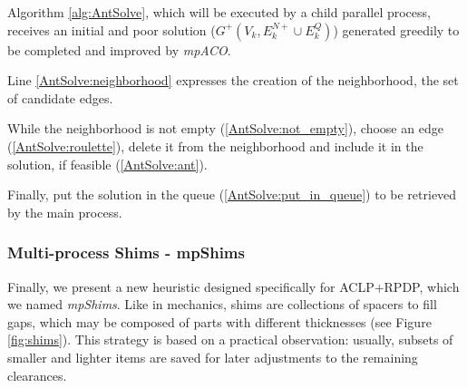 \documentclass[preprint,authoryear]{elsarticle}
\begin{document}
Algorithm \ref{alg:AntSolve}, which will be executed by a child parallel process, receives an initial and poor solution ($G^+(V_k, E^{N+}_k \cup E^Q_k)$) generated greedily to be completed and improved by {\it mpACO}.

Line \ref{AntSolve:neighborhood} expresses the creation of the neighborhood, the set of candidate edges.

While the neighborhood is not empty (\ref{AntSolve:not_empty}), choose an edge (\ref{AntSolve:roulette}), delete it from the neighborhood and include it in the solution, if feasible (\ref{AntSolve:ant}).

Finally, put the solution in the queue (\ref{AntSolve:put_in_queue}) to be retrieved by the main process.


\subsubsection{Multi-process Shims - mpShims}


Finally, we present a new heuristic designed specifically for ACLP+RPDP, which we named \emph{mpShims}. Like in mechanics, shims are collections of spacers to fill gaps, which may be composed of parts with different thicknesses (see Figure \ref{fig:shims}). This strategy is based on a practical observation: usually, subsets of smaller and lighter items are saved for later adjustments to the remaining clearances.
\end{document}
